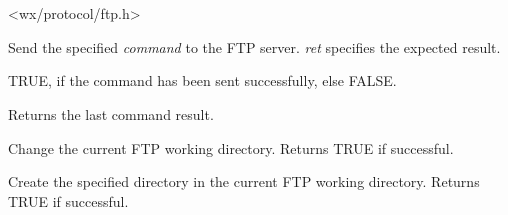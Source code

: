 \section{}\label{wxftp}




<wx/protocol/ftp.h>







Send the specified {\it command} to the FTP server. {\it ret} specifies
the expected result.


TRUE, if the command has been sent successfully, else FALSE.




Returns the last command result.




Change the current FTP working directory.
Returns TRUE if successful.



Create the specified directory in the current FTP working directory.
Returns TRUE if successful.



